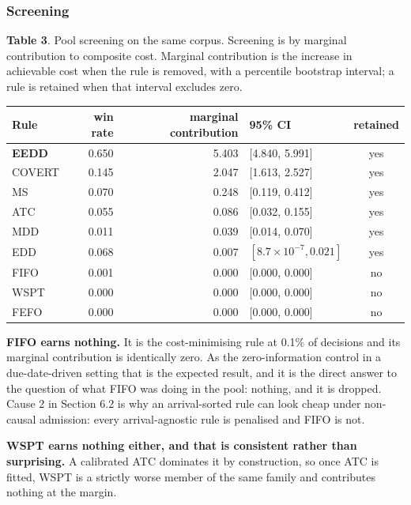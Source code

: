 \documentclass[review,3p,times]{elsarticle}
\newcounter{none}
\theoremstyle{definition}
\begin{document}
\subsubsection{Screening}\label{screening}

\textbf{Table 3}. Pool screening on the same corpus. Screening is by
marginal contribution to composite cost. Marginal contribution is the
increase in achievable cost when the rule is removed, with a percentile
bootstrap interval; a rule is retained when that interval excludes zero.

{\def\LTcaptype{none} %
\begin{longtable}[]{@{}lrrlc@{}}
\toprule\noalign{}
Rule & win rate & marginal contribution & 95\% CI & retained \\
\midrule\noalign{}
\endhead
\bottomrule\noalign{}
\endlastfoot
\textbf{EEDD} & 0.650 & 5.403 & {[}4.840, 5.991{]} & yes \\
COVERT & 0.145 & 2.047 & {[}1.613, 2.527{]} & yes \\
MS & 0.070 & 0.248 & {[}0.119, 0.412{]} & yes \\
ATC & 0.055 & 0.086 & {[}0.032, 0.155{]} & yes \\
MDD & 0.011 & 0.039 & {[}0.014, 0.070{]} & yes \\
EDD & 0.068 & 0.007 & \([8.7{\times}10^{-7}, 0.021]\) & yes \\
FIFO & 0.001 & 0.000 & {[}0.000, 0.000{]} & no \\
WSPT & 0.000 & 0.000 & {[}0.000, 0.000{]} & no \\
FEFO & 0.000 & 0.000 & {[}0.000, 0.000{]} & no \\
\end{longtable}
}

\textbf{FIFO earns nothing.} It is the cost-minimising rule at 0.1\% of
decisions and its marginal contribution is identically zero. As the
zero-information control in a due-date-driven setting that is the
expected result, and it is the direct answer to the question of what
FIFO was doing in the pool: nothing, and it is dropped. Cause 2 in
Section 6.2 is why an arrival-sorted rule can look cheap under
non-causal admission: every arrival-agnostic rule is penalised and FIFO
is not.

\textbf{WSPT earns nothing either, and that is consistent rather than
surprising.} A calibrated ATC dominates it by construction, so once ATC
is fitted, WSPT is a strictly worse member of the same family and
contributes nothing at the margin.
\end{document}
